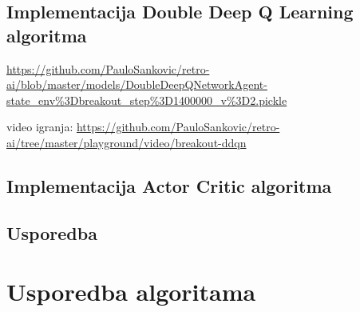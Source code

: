 \subsection{Implementacija Double Deep Q Learning algoritma}

\url{https://github.com/PauloSankovic/retro-ai/blob/master/models/DoubleDeepQNetworkAgent-state_env\%3Dbreakout_step\%3D1400000_v\%3D2.pickle}

video igranja:
\url{https://github.com/PauloSankovic/retro-ai/tree/master/playground/video/breakout-ddqn}

\subsection{Implementacija Actor Critic algoritma}

\subsection{Usporedba}

\section{Usporedba algoritama}
